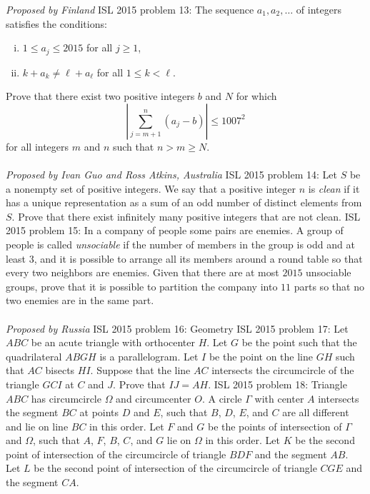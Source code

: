 \textit{Proposed by Finland} 
ISL 2015 problem 13:  The sequence $a_1,a_2,\dots$ of integers satisfies the conditions:
\begin{enumerate}[(i)]
  \item $1\le a_j\le2015$ for all $j\ge1$,
  \item $k+a_k\neq \ell+a_\ell$ for all $1\le k<\ell$.
\end{enumerate}
Prove that there exist two positive integers $b$ and $N$ for which
\[ \left\vert\sum_{j=m+1}^n(a_j-b)\right\vert\le1007^2 \]
for all integers $m$ and $n$ such that $n>m\ge N$. \\\\
\textit{Proposed by Ivan Guo and Ross Atkins, Australia} 
ISL 2015 problem 14:  Let $S$ be a nonempty set of positive integers. We say that a positive integer $n$ is \textit{clean} if it has a unique representation as a sum of an odd number of distinct elements from $S$. Prove that there exist infinitely many positive integers that are not clean. 
ISL 2015 problem 15:  In a company of people some pairs are enemies. A group of people is called \textit{unsociable} if the number of members in the group is odd and at least $3$, and it is possible to arrange all its members around a round table so that every two neighbors are enemies. Given that there are at most $2015$ unsociable groups, prove that it is possible to partition the company into $11$ parts so that no two enemies are in the same part. \\\\
\textit{Proposed by Russia} 
ISL 2015 problem 16:  Geometry 
ISL 2015 problem 17:  Let $ABC$ be an acute triangle with orthocenter $H$. Let $G$ be the point such that the quadrilateral $ABGH$ is a parallelogram. Let $I$ be the point on the line $GH$ such that $AC$ bisects $HI$. Suppose that the line $AC$ intersects the circumcircle of the triangle $GCI$ at $C$ and $J$. Prove that $IJ = AH$. 
ISL 2015 problem 18:  Triangle $ABC$ has circumcircle $\Omega$ and circumcenter $O$. A circle $\Gamma$ with center $A$ intersects the segment $BC$ at points $D$ and $E$, such that $B$, $D$, $E$, and $C$ are all different and lie on line $BC$ in this order. Let $F$ and $G$ be the points of intersection of $\Gamma$ and $\Omega$, such that $A$, $F$, $B$, $C$, and $G$ lie on $\Omega$ in this order. Let $K$ be the second point of intersection of the circumcircle of triangle $BDF$ and the segment $AB$. Let $L$ be the second point of intersection of the circumcircle of triangle $CGE$ and the segment $CA$. \\\\
